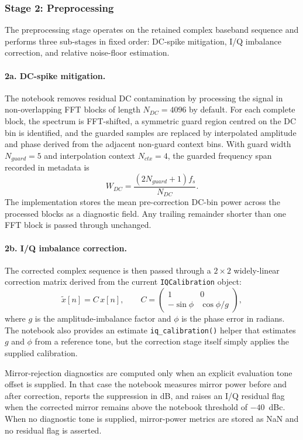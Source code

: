 \documentclass[11pt]{article}
\begin{document}
\subsubsection*{Stage 2: Preprocessing}

The preprocessing stage operates on the retained complex baseband sequence and performs three sub-stages in fixed order: DC-spike mitigation, I/Q imbalance correction, and relative noise-floor estimation.

\paragraph{2a. DC-spike mitigation.} The notebook removes residual DC contamination by processing the signal in non-overlapping FFT blocks of length $N_{DC} = 4096$ by default. For each complete block, the spectrum is FFT-shifted, a symmetric guard region centred on the DC bin is identified, and the guarded samples are replaced by interpolated amplitude and phase derived from the adjacent non-guard context bins. With guard width $N_{guard} = 5$ and interpolation context $N_{ctx} = 4$, the guarded frequency span recorded in metadata is
\begin{equation}
W_{DC} = \frac{(2 N_{guard} + 1) f_s}{N_{DC}}.
\end{equation}
The implementation stores the mean pre-correction DC-bin power across the processed blocks as a diagnostic field. Any trailing remainder shorter than one FFT block is passed through unchanged.

\paragraph{2b. I/Q imbalance correction.} The corrected complex sequence is then passed through a $2 \times 2$ widely-linear correction matrix derived from the current \texttt{IQCalibration} object:
\begin{equation}
\tilde{x}[n] = C\, x[n], \qquad C = \begin{pmatrix} 1 & 0 \\ -\sin\phi & \cos\phi / g \end{pmatrix},
\end{equation}
where $g$ is the amplitude-imbalance factor and $\phi$ is the phase error in radians. The notebook also provides an estimate \texttt{iq\_calibration()} helper that estimates $g$ and $\phi$ from a reference tone, but the correction stage itself simply applies the supplied calibration.

Mirror-rejection diagnostics are computed only when an explicit evaluation tone offset is supplied. In that case the notebook measures mirror power before and after correction, reports the suppression in dB, and raises an I/Q residual flag when the corrected mirror remains above the notebook threshold of $-40$~dBc. When no diagnostic tone is supplied, mirror-power metrics are stored as NaN and no residual flag is asserted.
\end{document}
